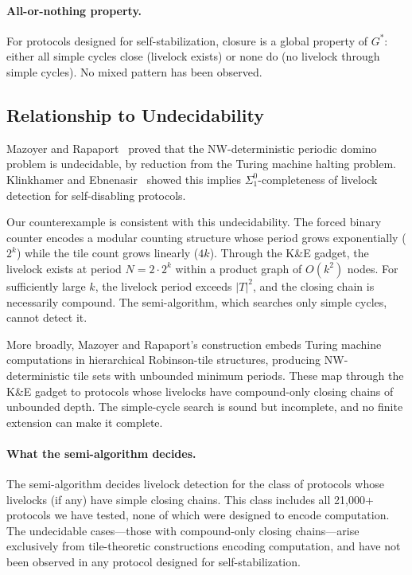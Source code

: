 \documentclass[11pt]{article}
\begin{document}
\paragraph{All-or-nothing property.} For protocols designed for self-stabilization, closure is a global property of $G^*$: either all simple cycles close (livelock exists) or none do (no livelock through simple cycles). No mixed pattern has been observed.

\subsection{Relationship to Undecidability}

Mazoyer and Rapaport~\cite{mazoyer-rapaport} proved that the NW-deterministic periodic domino problem is undecidable, by reduction from the Turing machine halting problem. Klinkhamer and Ebnenasir~\cite{klinkhamer-ebnenasir} showed this implies $\Sigma^0_1$-completeness of livelock detection for self-disabling protocols.

Our counterexample is consistent with this undecidability. The forced binary counter encodes a modular counting structure whose period grows exponentially ($2^k$) while the tile count grows linearly ($4k$). Through the K\&E gadget, the livelock exists at period $N = 2 \cdot 2^k$ within a product graph of $O(k^2)$ nodes. For sufficiently large $k$, the livelock period exceeds $|T|^2$, and the closing chain is necessarily compound. The semi-algorithm, which searches only simple cycles, cannot detect it.

More broadly, Mazoyer and Rapaport's construction embeds Turing machine computations in hierarchical Robinson-tile structures, producing NW-deterministic tile sets with unbounded minimum periods. These map through the K\&E gadget to protocols whose livelocks have compound-only closing chains of unbounded depth. The simple-cycle search is sound but incomplete, and no finite extension can make it complete.

\paragraph{What the semi-algorithm decides.} The semi-algorithm decides livelock detection for the class of protocols whose livelocks (if any) have simple closing chains. This class includes all 21{,}000+ protocols we have tested, none of which were designed to encode computation. The undecidable cases---those with compound-only closing chains---arise exclusively from tile-theoretic constructions encoding computation, and have not been observed in any protocol designed for self-stabilization.
\end{document}
